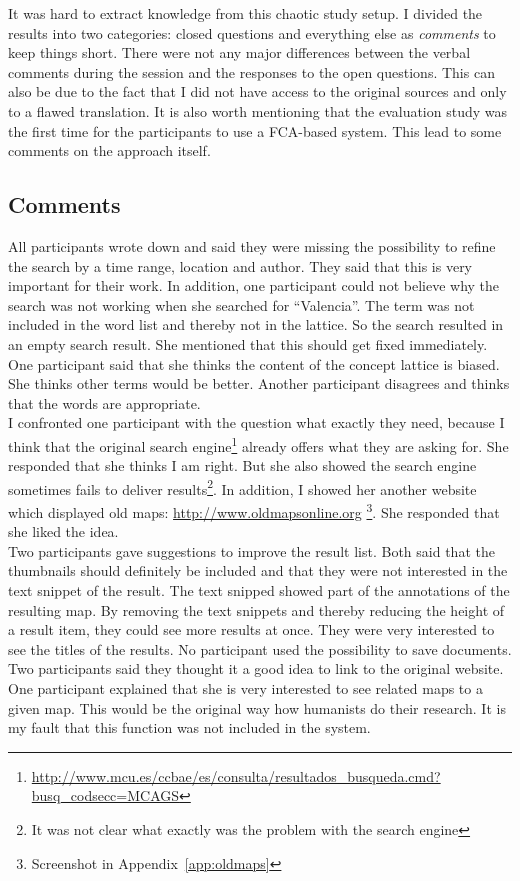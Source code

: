 \documentclass[11pt]{report}
\begin{document}
It was hard to extract knowledge from this chaotic study setup. I divided the results into two categories: closed questions and everything else as \textit{comments} to keep things short. There were not any major differences between the verbal comments during the session and the responses to the open questions. This can also be due to the fact that I did not have access to the original sources and only to a flawed translation. It is also worth mentioning that the evaluation study was the first time for the participants to use a FCA-based system. This lead to some comments on the approach itself.

\subsection{Comments}
All participants wrote down and said they were missing the possibility to refine the search by a time range, location and author. They said that this is very important for their work. In addition, one participant could not believe why the search was not working when she searched for ``Valencia''. The term was not included in the word list and thereby not in the lattice. So the search resulted in an empty search result. She mentioned that this should get fixed immediately. One participant said that she thinks the content of the concept lattice is biased. She thinks other terms would be better. Another participant disagrees and thinks that the words are appropriate. \\

I confronted one participant with the question what exactly they need, because I think that the original search engine\footnote{\url{http://www.mcu.es/ccbae/es/consulta/resultados_busqueda.cmd?busq_codsecc=MCAGS}} already offers what they are asking for. She responded that she thinks I am right. But she also showed the search engine sometimes fails to deliver results\footnote{It was not clear what exactly was the problem with the search engine}. In addition, I showed her another website which displayed old maps: \url{http://www.oldmapsonline.org} \footnote{Screenshot in Appendix~\ref{app:oldmaps}}. She responded that she liked the idea. \\

Two participants gave suggestions to improve the result list. Both said that the thumbnails should definitely be included and that they were not interested in the text snippet of the result. The text snipped showed part of the annotations of the resulting map. By removing the text snippets and thereby reducing the height of a result item, they could see more results at once. They were very interested to see the titles of the results. No participant used the possibility to save documents. Two participants said they thought it a good idea to link to the original website. One participant explained that she is very interested to see related maps to a given map. This would be the original way how humanists do their research. It is my fault that this function was not included in the system. \\
\end{document}
